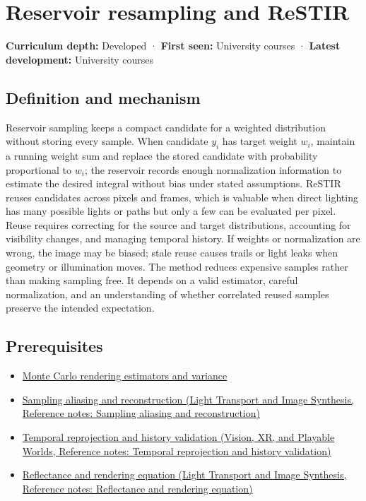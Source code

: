 \hypertarget{appendix-68be451b78b1}{}\label{referencestart:appendix-68be451b78b1}
\section{Reservoir resampling and ReSTIR}\label{appendix-68be451b78b1-reservoir-resampling-and-restir}

\textbf{Curriculum depth:} Developed · \textbf{First seen:} University courses · \textbf{Latest development:} University courses

\subsection{Definition and mechanism}\label{appendix-68be451b78b1-definition-and-mechanism}

Reservoir sampling keeps a compact candidate for a weighted distribution without storing every sample. When candidate \(y_i\) has target weight \(w_i\), maintain a running weight sum and replace the stored candidate with probability proportional to \(w_i\); the reservoir records enough normalization information to estimate the desired integral without bias under stated assumptions. ReSTIR reuses candidates across pixels and frames, which is valuable when direct lighting has many possible lights or paths but only a few can be evaluated per pixel. Reuse requires correcting for the source and target distributions, accounting for visibility changes, and managing temporal history. If weights or normalization are wrong, the image may be biased; stale reuse causes trails or light leaks when geometry or illumination moves. The method reduces expensive samples rather than making sampling free. It depends on a valid estimator, careful normalization, and an understanding of whether correlated reused samples preserve the intended expectation.

\subsection{Prerequisites}\label{appendix-68be451b78b1-prerequisites}

\begin{itemize}
\tightlist
\item
  \hyperref[appendix-031e02bf28af]{Monte Carlo rendering estimators and variance}
\item
  \href{../04-Light-Transport-and-Image-Synthesis/main.pdf\#nameddest=appendix-6a7869dd79a6}{Sampling aliasing and reconstruction (Light Transport and Image Synthesis, Reference notes: Sampling aliasing and reconstruction)}
\item
  \href{../07-Vision-XR-and-Playable-Worlds/main.pdf\#nameddest=appendix-0727340a4428}{Temporal reprojection and history validation (Vision, XR, and Playable Worlds, Reference notes: Temporal reprojection and history validation)}
\item
  \href{../04-Light-Transport-and-Image-Synthesis/main.pdf\#nameddest=appendix-96da0b153b77}{Reflectance and rendering equation (Light Transport and Image Synthesis, Reference notes: Reflectance and rendering equation)}
\end{itemize}

